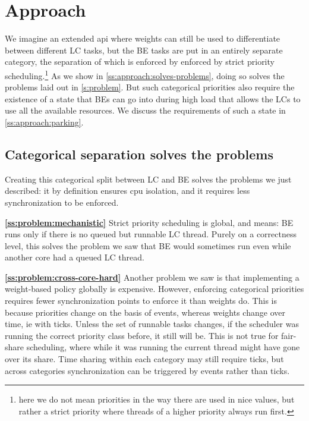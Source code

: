 \section{Approach}\label{s:approach}

We imagine an extended \cgroups{} api where weights can still be used to
differentiate between different LC tasks, but the BE tasks are put in an
entirely separate category, the separation of which is enforced by enforced by
strict priority scheduling.\footnote{here we do not mean priorities in the way
there are used in nice values, but rather a strict priority where threads of a
higher priority always run first.} As we show in
\autoref{ss:approach:solves-problems}, doing so solves the problems laid out in
\autoref{s:problem}. But such categorical priorities also require the existence
of a state that BEs can go into during high load that allows the LCs to use all
the available resources. We discuss the requirements of such a state in
\autoref{ss:approach:parking}.

\subsection{Categorical separation solves the
problems}\label{ss:approach:solves-problems}

Creating this categorical split between LC and BE  solves the problems we just
described: it by definition ensures cpu isolation, and it requires less
synchronization to be enforced.

\textbf{\autoref{ss:problem:mechanistic}} Strict priority scheduling is global,
and means: BE runs only if there is no queued but runnable LC thread. Purely on
a correctness level, this solves the problem we saw that BE would sometimes run
even while another core had a queued LC thread.

\textbf{\autoref{ss:problem:cross-core-hard}} Another problem we saw is that
implementing a weight-based policy globally is expensive. However, enforcing
categorical priorities requires fewer synchronization points to enforce it than
weights do. This is because priorities change on the basis of events, whereas
weights change over time, ie with ticks. Unless the set of runnable tasks
changes, if the scheduler was running the correct priority class before, it
still will be. This is not true for fair-share scheduling, where while it was
running the current thread might have gone over its share. Time sharing within
each category may still require ticks, but across categories synchronization can
be triggered by events rather than ticks.

